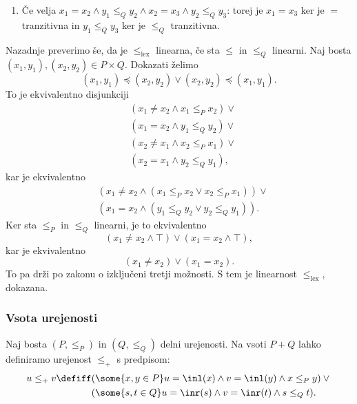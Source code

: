\begin{dokaz}
\begin{enumerate}
  \item Če velja $x_1 = x_2 \land y_1 \leq_Q y_2 \land x_2 = x_3 \land y_2 \leq_Q y_3$: torej je $x_1 = x_3$ ker je $=$ tranzitivna in $y_1 \leq_Q y_3$ ker je $\leq_Q$ tranzitivna.
  \end{enumerate}
  Nazadnje preverimo še, da je $\leq_\mathrm{lex}$ linearna, če sta $\leq$ in $\leq_Q$ linearni. Naj bosta $(x_1,y_1), (x_2,y_2) \in P \times Q$. Dokazati želimo
  \begin{equation*}
    (x_1, y_1) \preceq (x_2, y_2) \lor (x_2, y_2) \preceq (x_1, y_1).
  \end{equation*}
  To je ekvivalentno disjunkciji
  \begin{align*}
    & (x_1 \neq x_2 \land x_1 \leq_P x_2) \lor {} \\
    & (x_1 = x_2 \land y_1 \leq_Q y_2) \lor {} \\
    & (x_2 \neq x_1 \land x_2 \leq_P x_1) \lor {} \\
    & (x_2 = x_1 \land y_2 \leq_Q y_1),
  \end{align*}
  kar je ekvivalentno
  \begin{align*}
    & (x_1 \neq x_2 \land (x_1 \leq_P x_2 \lor x_2 \leq_P x_1)) \lor {} \\
    &(x_1 = x_2 \land (y_1 \leq_Q y_2 \lor y_2 \leq_Q y_1)).
  \end{align*}
  Ker sta $\leq_P$ in $\leq_Q$ linearni, je to ekvivalentno
  \begin{equation*}
    (x_1 \neq x_2 \land \top) \lor (x_1 = x_2 \land \top),
  \end{equation*}
  kar je ekvivalentno
  \begin{equation*}
    (x_1 \neq x_2) \lor (x_1 = x_2).
  \end{equation*}
  To pa drži po zakonu o izključeni tretji možnosti. S tem je linearnost $\leq_\mathrm{lex}$, dokazana.
\end{dokaz}

\subsubsection{Vsota urejenosti}

Naj bosta $(P, \leq_P)$ in $(Q, \leq_Q)$ delni urejenosti. Na vsoti $P + Q$ lahko
definiramo urejenost $\leq_{+}$ s predpisom:
%
\begin{equation*}
  u \leq_{+} v \defiff
  \begin{aligned}[t]
    & (\some{x, y \in P} u = \inl(x) \land v = \inl(y) \land x \leq_P y) \lor {} \\
    & (\some{s, t \in Q} u = \inr(s) \land v = \inr(t) \land s \leq_Q t).
  \end{aligned}
\end{equation*}


